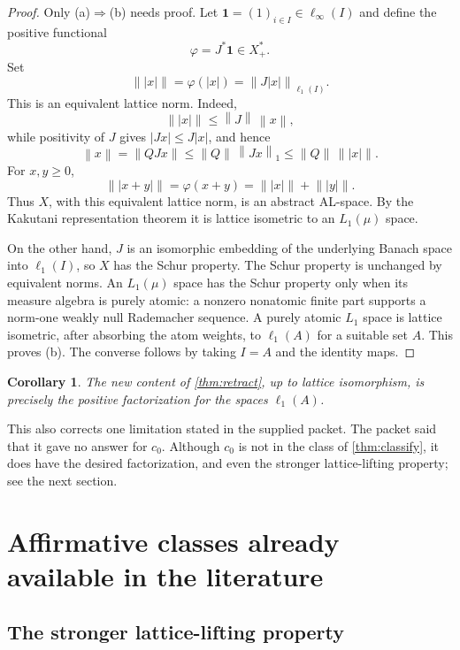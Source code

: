 \documentclass[11pt]{article}
\newtheorem{corollary}[theorem]{Corollary}
\newcommand{\norm}[1]{\left\lVert #1\right\rVert}
\begin{document}
\begin{proof}
Only (a)$\Rightarrow$(b) needs proof.  Let
$\mathbf 1=(1)_{i\in I}\in\ell_\infty(I)$ and define the positive functional
\[
 \varphi=J^*\mathbf 1\in X^*_+.
\]
Set
\[
 \lVert\!\lvert x\rvert\!\rVert=\varphi(|x|)=\norm{J|x|}_{\ell_1(I)}.
\]
This is an equivalent lattice norm.  Indeed,
\[
 \lVert\!\lvert x\rvert\!\rVert
 \leq \norm J\,\norm x,
\]
while positivity of $J$ gives $|Jx|\leq J|x|$, and hence
\[
 \norm x=\norm{QJx}
 \leq \norm Q\,\norm{Jx}_1
 \leq \norm Q\,\lVert\!\lvert x\rvert\!\rVert.
\]
For $x,y\geq0$,
\[
 \lVert\!\lvert x+y\rvert\!\rVert
 =\varphi(x+y)
 =\lVert\!\lvert x\rvert\!\rVert+
  \lVert\!\lvert y\rvert\!\rVert.
\]
Thus $X$, with this equivalent lattice norm, is an abstract AL-space.  By the
Kakutani representation theorem it is lattice isometric to an $L_1(\mu)$
space.

On the other hand, $J$ is an isomorphic embedding of the underlying Banach
space into $\ell_1(I)$, so $X$ has the Schur property.  The Schur property is
unchanged by equivalent norms.  An $L_1(\mu)$ space has the Schur property
only when its measure algebra is purely atomic: a nonzero nonatomic finite
part supports a norm-one weakly null Rademacher sequence.  A purely atomic
$L_1$ space is lattice isometric, after absorbing the atom weights, to
$\ell_1(A)$ for a suitable set $A$.  This proves (b).  The converse follows by
taking $I=A$ and the identity maps.
\end{proof}

\begin{corollary}
The new content of \cref{thm:retract}, up to lattice isomorphism, is precisely
the positive factorization for the spaces $\ell_1(A)$.
\end{corollary}

This also corrects one limitation stated in the supplied packet.  The packet
said that it gave no answer for $c_0$.  Although $c_0$ is not in the class of
\cref{thm:classify}, it does have the desired factorization, and even the
stronger lattice-lifting property; see the next section.

\section{Affirmative classes already available in the literature}

\subsection{The stronger lattice-lifting property}
\end{document}
